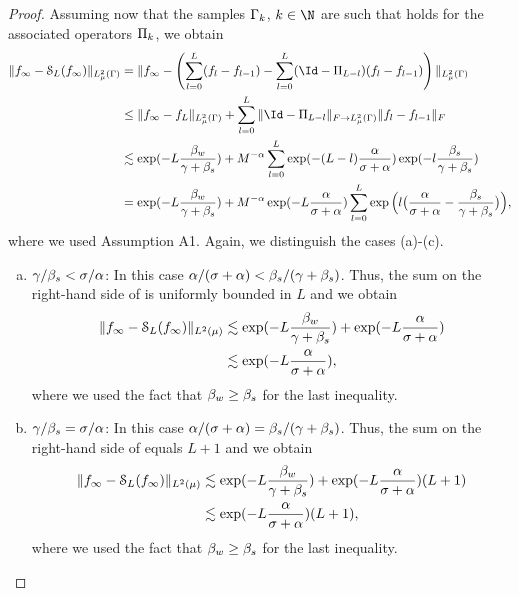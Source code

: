 \begin{proof}
		Assuming now that the samples $\domPS_{k}$, $k\in\N$ are such that  holds for the associated operators $\P_k$, we obtain
		\begin{equation}
		\label{eq:convbounds}
		\begin{split}
		\norm{\rs_{\infty}-\smol_{L}(\rs_{\infty})}{L^2_{\measure}(\domPS)}
		&=\norm{\rs_{\infty}-\left(\sum_{l=0}^{L}(\rs_{l}-\rs_{l-1})-\sum_{l=0}^{L}(\Id-\Pi_{L-l})(\rs_{l}-\rs_{l-1})\right)}{L^2_{\measure}(\domPS)}\\
		&\leq \norm{\rs_{\infty}-\rs_{L}}{L^2_{\measure}(\domPS)}+\sum_{l=0}^{L}\norm{\Id-\Pi_{L-l}}{\F\to L^2_{\measure}(\domPS)}\norm{\rs_{l}-\rs_{l-1}}{\F}\\
		&\lesssim \exp(-L\frac{\wc}{\gamma+\sc})+M^{-\alpha}\sum_{l=0}^{L}\exp(-(L-l)\frac{\alpha}{\dimp+\alpha})\exp(-l\frac{\sc}{\gamma+\sc})\\
		&= \exp(-L\frac{\wc}{\gamma+\sc})+M^{-\alpha}\exp(-L\frac{\alpha}{\dimp+\alpha})\sum_{l=0}^{L}\exp\Big(l\big(\frac{\alpha}{\dimp+\alpha}-\frac{\sc}{\gamma+\sc}\big)\Big),\\
		\end{split}
		\end{equation}
		where we used Assumption A1.
			Again, we distinguish the cases (a)-(c).
			\begin{enumerate}[(a)]
				\item $\gamma/\sc<\dimp/\alpha$:  In this case $\alpha/(\dimp+\alpha)<\sc/(\gamma+\sc)$. Thus, the sum on the right-hand side of  is uniformly bounded in $L$ and we obtain 
				\begin{equation*}
			\begin{split}
			\norm{\rs_{\infty}-\smol_{L}(\rs_{\infty})}{L^2(\measure)}&\lesssim \exp(-L\frac{\wc}{\gamma+\sc})+\exp(-L\frac{\alpha}{\dimp+\alpha})\\
			&\lesssim \exp(-L\frac{\alpha}{\dimp+\alpha}),
			\end{split}
				\end{equation*}
				where we used the fact that $\wc\geq \sc$ for the last inequality.
				
				\item $\gamma/\sc=\dimp/\alpha$: In this case $\alpha/(\dimp+\alpha)=\sc/(\gamma+\sc)$. Thus, the sum on the right-hand side of  equals $L+1$ and we obtain
				\begin{equation*}
				\begin{split}
				\norm{\rs_{\infty}-\smol_{L}(\rs_{\infty})}{L^2(\measure)}&\lesssim \exp(-L\frac{\wc}{\gamma+\sc})+\exp(-L\frac{\alpha}{\dimp+\alpha})(L+1)\\
				&\lesssim \exp(-L\frac{\alpha}{\dimp+\alpha})(L+1),
				\end{split}
				\end{equation*}
				where we used the fact that $\wc\geq \sc$ for the last inequality.
				

\end{enumerate}
\end{proof}
